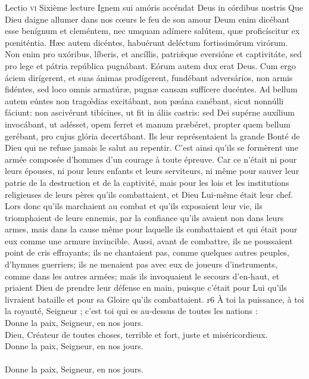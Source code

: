 \documentclass[twoside]{article}
\begin{document}
\begin{paracol}[1]{2}
\lectioresponsorium
	{Lectio \textsc{vi}}
	{Sixième lecture}
	{Ignem sui amóris accéndat Deus in córdibus nostris}
	{Que Dieu daigne allumer dans nos cœurs le feu de son amour}
	{
		Deum enim dicébant esse benígnum et cleméntem, nec umquam adímere salútem, quæ proficíscitur ex pœniténtia. Hæc autem dicéntes, habuérunt deléctum fortissimórum virórum. Non enim pro uxóribus, líberis, et ancíllis, patriǽque eversióne et captivitáte, sed pro lege et pátria república pugnábant. Eórum autem dux erat Deus. Cum ergo áciem dirígerent, et suas ánimas prodígerent, fundébant adversários, non armis fidéntes, sed loco omnis armatúræ, pugnæ causam suffícere ducéntes. Ad bellum autem eúntes non tragœ́dias excitábant, non pæána canébant, sicut nonnúlli fáciunt: non ascivérunt tibícines, ut fit in áliis castris: sed Dei supérne auxílium invocábant, ut adésset, opem ferret et manum præbéret, propter quem bellum gerébant, pro cujus glória decertábant.
	}
	{Ils leur représentaient la grande Bonté de Dieu qui ne refuse jamais le salut au repentir. C'est ainsi qu'ils se formèrent une armée composée d'hommes d'un courage à toute épreuve. Car ce n'était ni pour leurs épouses, ni pour leurs enfants et leurs serviteurs, ni même pour sauver leur patrie de la destruction et de la captivité, mais pour les lois et les institutions religieuses de leurs pères qu'ils combattaient, et Dieu Lui-même était leur chef. Lors donc qu'ils marchaient au combat et qu'ils exposaient leur vie, ils triomphaient de leurs ennemis, par la confiance qu'ils avaient non dans leurs armes, mais dans la cause même pour laquelle ils combattaient et qui était pour eux comme une armure invincible. Aussi, avant de combattre, ils ne poussaient point de cris effrayants; ils ne chantaient pas, comme quelques autres peuples, d'hymnes guerriers; ils ne menaient pas avec eux de joueurs d'instruments, comme dans les autres armées; mais ils invoquaient le secours d'en-haut, et priaient Dieu de prendre leur défense en main, puisque c'était pour Lui qu'ils livraient bataille et pour sa Gloire qu'ils combattaient.}
	{r6}
	{\newpage \rr À toi la puissance, à toi la royauté, Seigneur ; c’est toi qui es au-dessus de toutes les nations :\\
	\GreSpecial{*} Donne la paix, Seigneur, en nos jours.\\
	\vv Dieu, Créateur de toutes choses, terrible et fort, juste et miséricordieux.\\
	\GreSpecial{*} Donne la paix, Seigneur, en nos jours.\\
	\versetGloireAuPere{}\\
	\GreSpecial{*} Donne la paix, Seigneur, en nos jours.}


\end{paracol}
\end{document}
